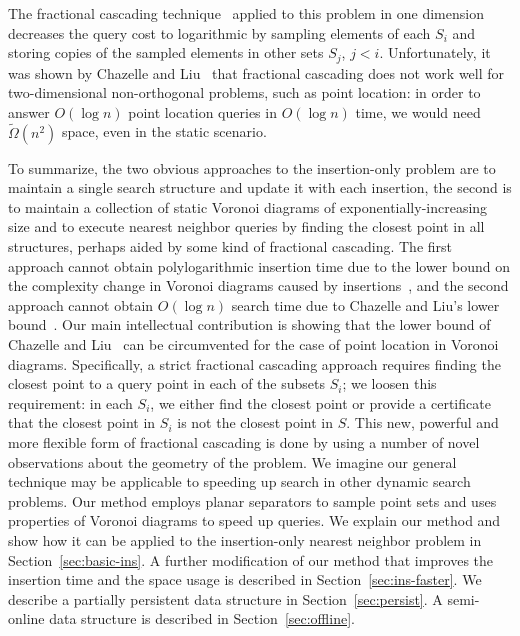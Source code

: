 \documentclass[12pt,a4paper,USenglish,cleveref, autoref, thm-restate]{article}
\newcommand{\eps}{\varepsilon}
\newif\ifsocg
\newcommand{\eps}{\varepsilon}
\newcommand{\eps}{\varepsilon}
\begin{document}
The fractional cascading technique~\cite{ChazelleG86} applied to this problem in one dimension decreases the query cost to logarithmic by sampling elements of each $S_i$ and storing copies of the  sampled elements in other sets $S_j$, $j<i$. Unfortunately, it was shown by Chazelle and Liu~\cite{ChazelleL04} that fractional cascading does not work well for two-dimensional non-orthogonal problems, such as point location:  in order to answer $O(\log n)$ point location queries in $O(\log n)$ time, we would need $\tilde{\Omega}(n^2)$ space, even in the static scenario.

To summarize, the two obvious approaches to the insertion-only problem are to maintain a single search structure and update it with each insertion, the second is to maintain a collection of static Voronoi diagrams of exponentially-increasing size and to execute nearest neighbor queries by finding the closest point in all structures, perhaps aided by some kind of fractional cascading. The first approach cannot obtain polylogarithmic insertion time due to the lower bound on the complexity change in Voronoi diagrams caused by insertions~\cite{AllenBIL17}, and the second approach cannot obtain $O(\log n)$ search time due to Chazelle and Liu's lower bound~\cite{ChazelleL04}.
Our main intellectual contribution is showing that the lower bound of Chazelle and Liu~\cite{ChazelleL04} can be circumvented for  the case of point location in Voronoi diagrams. Specifically, a strict fractional cascading approach requires finding the closest point to a query point in each of the subsets $S_i$; we loosen this requirement: in each $S_i$, we either find the closest point or provide a certificate that the closest point in $S_i$ is not the closest point in $S$. This new, powerful and more flexible form of fractional cascading is done by  using a number of novel observations about the geometry of the problem.
 We imagine our general technique may be applicable to speeding up search in other dynamic search problems.
Our method employs planar separators to sample point sets and uses properties of Voronoi diagrams to speed up queries. We explain our method and show how it can be applied to the insertion-only nearest neighbor problem in Section~\ref{sec:basic-ins}. 
\ifarxiv
A further modification of our method that improves the insertion time and the space usage is described in Section~\ref{sec:ins-faster}. We describe a partially persistent data structure in Section~\ref{sec:persist}.  A semi-online data structure is described in Section~\ref{sec:offline}. 
\fi
\ifsocg
A further modification of our method, that will be described in the full version of this paper,   improves the insertion time and the insertion time  to $O(\log^{1+\eps}n)$ and space usage to $O(n)$. The description of partially persistent and semi-online data structures is also deferred to the full version. 
\fi
\end{document}
